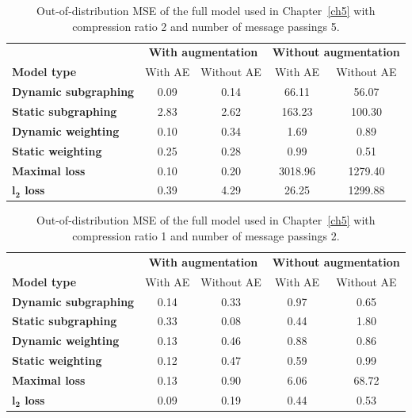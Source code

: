 \documentclass[12pt,a4paper]{report}
\begin{document}
\begin{appendices}
\begin{table}
\centering
\caption{Out-of-distribution MSE of the full model used in Chapter~\ref{ch5} with compression ratio 2 and number of message passings 5.}
\label{table_2_5}
\begin{tabular}{lcccc}
\toprule
 & \multicolumn{2}{c}{\textbf{With augmentation}} & \multicolumn{2}{c}{\textbf{Without augmentation}} \\
 \cmidrule{2-3} \cmidrule{4-5}
\textbf{Model type} & With AE & Without AE & With AE & Without AE \\
\midrule
\textbf{Dynamic subgraphing} & 0.09 & 0.14 & 66.11 & 56.07 \\
\textbf{Static subgraphing} & 2.83 & 2.62 & 163.23 & 100.30 \\
\textbf{Dynamic weighting} & 0.10 & 0.34 & 1.69 & 0.89 \\
\textbf{Static weighting} & 0.25 & 0.28 & 0.99 & 0.51 \\
\textbf{Maximal loss} & 0.10 & 0.20 & 3018.96 & 1279.40 \\
\textbf{$\boldsymbol{l_2}$ loss} & 0.39 & 4.29 & 26.25 & 1299.88 \\
\bottomrule
\end{tabular}
\end{table}

\begin{table}
\centering
\caption{Out-of-distribution MSE of the full model used in Chapter~\ref{ch5} with compression ratio 1 and number of message passings 2.}
\label{table_1_2}
\begin{tabular}{lcccc}
\toprule
 & \multicolumn{2}{c}{\textbf{With augmentation}} & \multicolumn{2}{c}{\textbf{Without augmentation}} \\
 \cmidrule{2-3} \cmidrule{4-5}
\textbf{Model type} & With AE & Without AE & With AE & Without AE \\
\midrule
\textbf{Dynamic subgraphing} & 0.14 & 0.33 & 0.97 & 0.65 \\
\textbf{Static subgraphing} & 0.33 & 0.08 & 0.44 & 1.80 \\
\textbf{Dynamic weighting} & 0.13 & 0.46 & 0.88 & 0.86 \\
\textbf{Static weighting} & 0.12 & 0.47 & 0.59 & 0.99 \\
\textbf{Maximal loss} & 0.13 & 0.90 & 6.06 & 68.72 \\
\textbf{$\boldsymbol{l_2}$ loss} & 0.09 & 0.19 & 0.44 & 0.53 \\
\bottomrule
\end{tabular}
\end{table}


\end{appendices}
\end{document}
